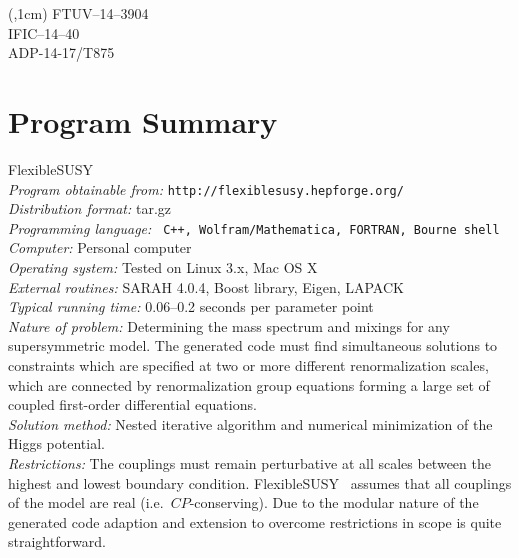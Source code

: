 \documentclass[final,3p,11pt,pdflatex]{elsarticle}
\makeatletter
\newcommand{\fs}{FlexibleSUSY\@\xspace}
\newcommand{\mathematica}{Mathematica\xspace}
\makeatother
\begin{document}
\begin{textblock*}{7em}(\textwidth,1cm)
\noindent\footnotesize
FTUV--14--3904 \\
IFIC--14--40 \\
ADP-14-17/T875
\end{textblock*}

\clearpage
\section{Program Summary}
 \fs\\[0.5em] {\em Program obtainable from:}
         {\tt http://flexiblesusy.hepforge.org/}\\[0.5em] {\em Distribution
           format:}\/ tar.gz\\[0.5em] {\em Programming language:} {\tt
           C++, Wolfram/\mathematica, FORTRAN, Bourne shell}\\[0.5em]
         {\em Computer:}\/ Personal computer\\[0.5em] {\em Operating
           system:}\/ Tested on Linux 3.x, Mac OS X\\[0.5em]
         {\em External routines:}\/ SARAH 4.0.4, Boost library,
         Eigen, LAPACK\\[0.5em] {\em
           Typical running time:}\/ 0.06--0.2 seconds per parameter
         point\\[0.5em] {\em Nature of problem:}\/ Determining the mass
         spectrum and mixings for any supersymmetric model. The
         generated code must find simultaneous solutions to
         constraints which are specified at two or more different
         renormalization scales, which are connected by
         renormalization group equations forming a large set of
         coupled first-order differential equations. \\[0.5em] {\em Solution method:}\/
         Nested iterative algorithm and numerical minimization of the
         Higgs potential.  \\[0.5em] {\em Restrictions:} The couplings must
         remain perturbative at all scales between the highest and
         lowest boundary condition.  \fs~ assumes that all couplings
         of the model are real (i.e.\ $CP$-conserving). Due to the
         modular nature of the generated code adaption and extension
         to overcome restrictions in scope is quite straightforward.

\clearpage
\tableofcontents
\end{document}
